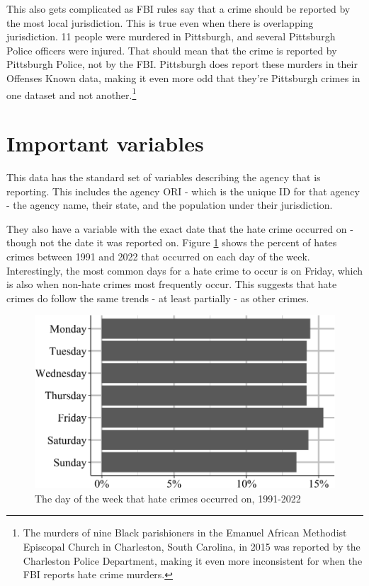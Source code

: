 \documentclass[
  12pt,
  openany]{book}
\begin{document}
This also gets complicated as FBI rules say that a crime should be reported by the most local jurisdiction. This is true even when there is overlapping jurisdiction. 11 people were murdered in Pittsburgh, and several Pittsburgh Police officers were injured. That should mean that the crime is reported by Pittsburgh Police, not by the FBI. Pittsburgh does report these murders in their Offenses Known data, making it even more odd that they're Pittsburgh crimes in one dataset and not another.\footnote{The murders of nine Black parishioners in the Emanuel African Methodist Episcopal Church in Charleston, South Carolina, in 2015 was reported by the Charleston Police Department, making it even more inconsistent for when the FBI reports hate crime murders.}

\section{Important variables}\label{important-variables-6}

This data has the standard set of variables describing the agency that is reporting. This includes the agency ORI - which is the unique ID for that agency - the agency name, their state, and the population under their jurisdiction.

They also have a variable with the exact date that the hate crime occurred on - though not the date it was reported on. Figure \ref{fig:hateCrimesByDay} shows the percent of hates crimes between 1991 and 2022 that occurred on each day of the week. Interestingly, the most common days for a hate crime to occur is on Friday, which is also when non-hate crimes most frequently occur. This suggests that hate crimes do follow the same trends - at least partially - as other crimes.

\begin{figure}

{\centering \includegraphics[width=0.9\linewidth]{09_hate_crime_files/figure-latex/hateCrimesByDay-1} 

}

\caption{The day of the week that hate crimes occurred on, 1991-2022}\label{fig:hateCrimesByDay}
\end{figure}
\end{document}
